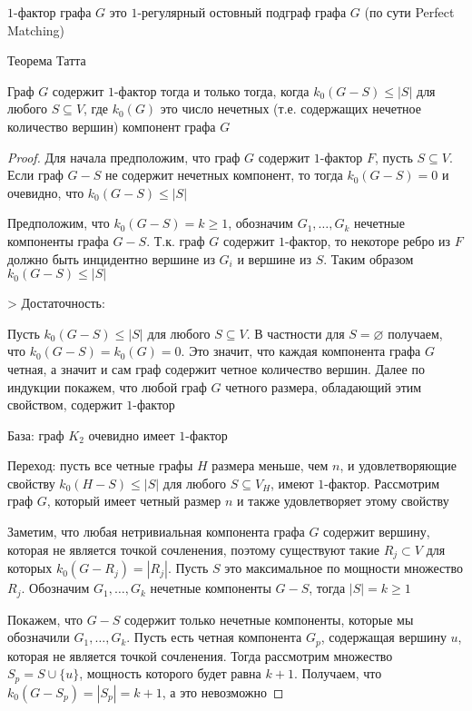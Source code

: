 
\begin{definition}
$1$-фактор графа $G$ это $1$-регулярный остовный подграф графа $G$ (по сути Perfect Matching)
\end{definition}

\begin{theorem} 
    Теорема Татта
    
    Граф $G$ содержит $1$-фактор тогда и только тогда, когда $k_0(G - S) \leq |S|$ 
    для любого $S \subseteq V$, где $k_0(G)$ это число нечетных (т.е. содержащих нечетное количество вершин) компонент графа $G$
\end{theorem}

\begin{proof}
    Для начала предположим, что граф $G$ содержит $1$-фактор $F$, пусть $S \subseteq V$. Если граф $G - S$ не содержит нечетных компонент, то тогда $k_0(G - S) = 0$ и очевидно, что $k_0(G - S) \leq |S|$

Предположим, что $k_0(G - S) = k \geq 1$, обозначим $G_1, \dots, G_k$ нечетные компоненты графа $G - S$. Т.к. граф $G$ содержит $1$-фактор, то некоторе ребро из $F$ должно быть инцидентно вершине из $G_i$ и вершине из $S$. Таким образом $k_0(G - S) \leq |S|$

> Достаточность:

Пусть $k_0(G - S) \leq |S|$ для любого $S \subseteq V$. В частности для $S = \varnothing$ получаем, что $k_0(G - S) = k_0(G) = 0$. Это значит, что каждая компонента графа $G$ четная, а значит и сам граф содержит четное количество вершин. Далее по индукции покажем, что любой граф $G$ четного размера, обладающий этим свойством, содержит $1$-фактор

База: граф $K_2$ очевидно имеет $1$-фактор

Переход: пусть все четные графы $H$ размера меньше, чем $n$, и удовлетворяющие свойству $k_0(H - S) \leq |S|$ для любого $S \subseteq V_H$, имеют
$1$-фактор. Рассмотрим граф $G$, который имеет четный размер $n$ и также удовлетворяет этому свойству

Заметим, что любая нетривиальная компонента графа $G$ содержит вершину, которая не является точкой сочленения, 
поэтому существуют такие $R_j \subset V$ для которых $k_0(G - R_j) = |R_j|$. Пусть $S$ это максимальное по мощности множество $R_j$. 
Обозначим $G_1, \dots, G_k$ нечетные компоненты $G - S$, тогда $|S| = k \geq 1$

Покажем, что $G - S$ содержит только нечетные компоненты, которые мы обозначили $G_1, \dots, G_k$. 
Пусть есть четная компонента $G_p$, содержащая вершину $u$, которая не является точкой сочленения. 
Тогда рассмотрим множество $S_p = S \cup \{u\}$, мощность которого будет равна $k + 1$. Получаем, что $k_0(G - S_p) = |S_p| = k + 1$, а это невозможно
\end{proof}
